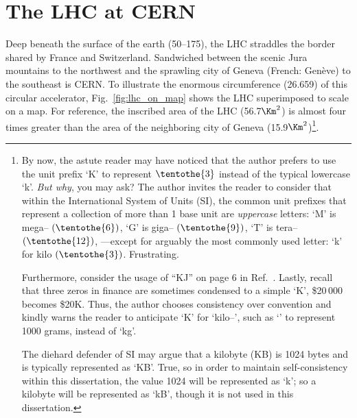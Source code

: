 \section{The LHC at CERN}
Deep beneath the surface of the earth (50--175\meter), the LHC straddles the border shared by France and Switzerland.
Sandwiched between the scenic Jura mountains to the northwest and the sprawling city of Geneva (French: Genève) to the southeast is CERN.
To illustrate the enormous circumference (26.659\Km) of this circular accelerator, Fig.~\ref{fig:lhc_on_map} shows the LHC superimposed to scale on a map.
For reference, the inscribed area of the LHC (56.7$\Km^{2}$) is almost four times greater than the area of the neighboring city of Geneva (15.9$\Km^{2}$)\footnote{
    By now, the astute reader may have noticed that the author prefers to use the unit prefix `K' to represent $\tentothe{3}$ instead of the typical lowercase `k'.
    \emph{But why}, you may ask?
    The author invites the reader to consider that within the International System of Units (SI), the common unit prefixes that represent a collection of more than 1 base unit are \emph{uppercase} letters: 
    \eg `M' is mega-- $(\tentothe{6})$,
    `G' is giga-- $(\tentothe{9})$,
    `T' is tera-- $(\tentothe{12})$, \etc---except for arguably the most commonly used letter: `k' for kilo $(\tentothe{3})$.
    Frustrating.

    Furthermore, consider the usage of ``KJ'' on page 6 in Ref.~\cite{collaboration_cms_2008}.
    Lastly, recall that three zeros in finance are sometimes condensed to a simple `K', \eg \$20\,000 becomes \$20K.
    Thus, the author chooses consistency over convention and kindly warns the reader to anticipate `K' for `kilo--', such as `\Kgns' to represent 1000 grams, instead of `kg'.
    
    The diehard defender of SI may argue that a kilobyte (KB) is 1024 bytes and is typically represented as `KB'.
    True, so in order to maintain self-consistency within this dissertation, the value 1024 will be represented as `k';
    so a kilobyte will be represented as `kB', though it is not used in this dissertation. 
}.


